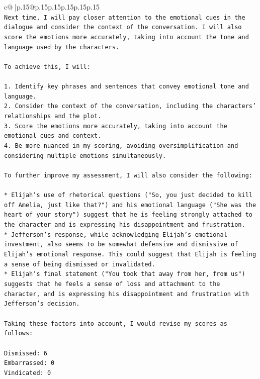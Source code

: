 \documentclass{article}
\begin{document}
{\begin{supertabular}{c@{$\;$}|p{.15\linewidth}@{}p{.15\linewidth}p{.15\linewidth}p{.15\linewidth}p{.15\linewidth}p{.15\linewidth}}
{{{\\ 
\texttt{Next time, I will pay closer attention to the emotional cues in the dialogue and consider the context of the conversation. I will also score the emotions more accurately, taking into account the tone and language used by the characters.} \\
\\ 
\texttt{To achieve this, I will:} \\
\\ 
\texttt{1. Identify key phrases and sentences that convey emotional tone and language.} \\
\texttt{2. Consider the context of the conversation, including the characters' relationships and the plot.} \\
\texttt{3. Score the emotions more accurately, taking into account the emotional cues and context.} \\
\texttt{4. Be more nuanced in my scoring, avoiding oversimplification and considering multiple emotions simultaneously.} \\
\\ 
\texttt{To further improve my assessment, I will also consider the following:} \\
\\ 
\texttt{* Elijah's use of rhetorical questions ("So, you just decided to kill off Amelia, just like that?") and his emotional language ("She was the heart of your story") suggest that he is feeling strongly attached to the character and is expressing his disappointment and frustration.} \\
\texttt{* Jefferson's response, while acknowledging Elijah's emotional investment, also seems to be somewhat defensive and dismissive of Elijah's emotional response. This could suggest that Elijah is feeling a sense of being dismissed or invalidated.} \\
\texttt{* Elijah's final statement ("You took that away from her, from us") suggests that he feels a sense of loss and attachment to the character, and is expressing his disappointment and frustration with Jefferson's decision.} \\
\\ 
\texttt{Taking these factors into account, I would revise my scores as follows:} \\
\\ 
\texttt{Dismissed: 6} \\
\texttt{Embarrassed: 0} \\
\texttt{Vindicated: 0} \\
}}}
\end{supertabular}}
\end{document}
